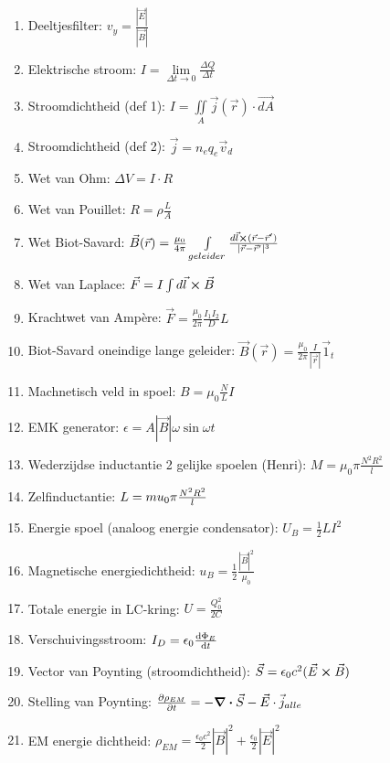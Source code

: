 \documentclass[12pt]{article}
\begin{document}
\begin{enumerate}
	    \item Deeltjesfilter:  $v_y = \frac{|\vec{E}|}{|\vec{B}|} $
	    \item Elektrische stroom: $ I = \lim\limits_{\Delta t \to 0} \frac{ \Delta Q}{\Delta t} $
	    \item Stroomdichtheid (def 1):  $ I = \iint\limits_A \vec{j}(\vec{r})\cdot \vec{dA} $
	    \item Stroomdichtheid (def 2): $ \vec{j} = n_e q_e \vec{v}_d $
	    \item Wet van Ohm: $\Delta V = I \cdot R $
	    \item Wet van Pouillet:  $ R = \rho \frac{L}{A} $
	    \item Wet Biot-Savard: $ \vec{B}(\vec{r}) = \frac{\mu_0}{4\pi} \int\limits_{geleider} \frac{d\vec{l}\cross (\vec{r}-\vec{r}')}{|\vec{r}-\vec{r}'|^3}$
	    \item Wet van Laplace: $ \vec{F} = I \int d\vec{l}\cross \vec{B} $
	    \item Krachtwet van Amp\`ere: $ \vec{F} = \frac{\mu_0}{2\pi}\frac{I_1 I_2}{D}L $
	    \item Biot-Savard oneindige lange geleider: $ \vec{B}(\vec{r}) = \frac{\mu_0}{2\pi}\frac{I}{|\vec{r}|}\vec{1}_t$
	    \item Machnetisch veld in spoel: $ B = \mu_0 \frac{N}{L} I $
	    \item EMK generator: $ \epsilon = A |\vec{B}| \omega \sin{\omega t}$
	    \item Wederzijdse inductantie 2 gelijke spoelen (Henri): $ M = \mu_0 \pi \frac{N^2 R^2}{l} $
	    \item Zelfinductantie: $ L = \\mu_0\pi \frac{N^2R^2}{l} $
	    \item Energie spoel (analoog energie condensator): $ U_B = \frac{1}{2} LI^2 $
	    \item Magnetische energiedichtheid: $ u_B = \frac{1}{2} \frac{|\vec{B}|^2}{\mu_0} $
	    \item Totale energie in LC-kring: $ U = \frac{Q_0^2}{2C} $
	    \item Verschuivingsstroom: $ I_D = \epsilon_0 \dv{\Phi_E}{t} $
	    \item Vector van Poynting (stroomdichtheid): $ \vec{S} = \epsilon_0 c^2 (\vec{E}\cross\vec{B})$
	    \item Stelling van Poynting: $ \pdv{\rho_{EM}}{t} = -\div \vec{S} - \vec{E} \cdot \vec{j}_{alle} $
	    \item EM energie dichtheid: $ \rho_{EM} = \frac{\epsilon_0 c^2}{2}|\vec{B}|^2 + \frac{\epsilon_0}{2}|\vec{E}|^2 $

\end{enumerate}
\end{document}
